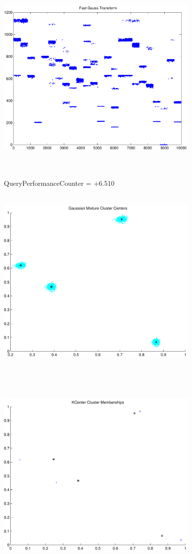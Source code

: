 \documentclass[9pt]{article}
\theoremstyle{plain}
\theoremstyle{definition}
\theoremstyle{remark}
\numberwithin{equation}{section}
\begin{document}
\includegraphics[width=10.0cm,height=10.0cm]{FGT24_Centers.pdf}

QueryPerformanceCounter  =  +6.510
\includegraphics[width=10.0cm,height=10.0cm]{GaussianMixture_ClusterCenters4_Centers.pdf}

\includegraphics[width=10.0cm,height=10.0cm]{KCenterClusterMemberships_4_Centers.pdf}
\end{document}
